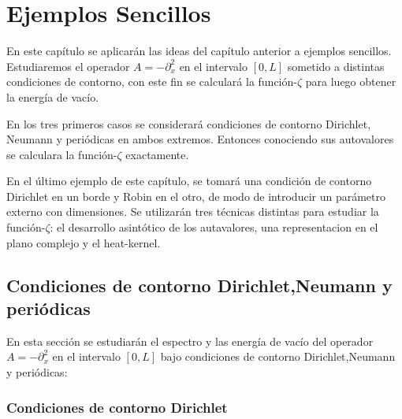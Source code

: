 \chapter{Ejemplos Sencillos}
\label{cap.sencillos}

En este capítulo se aplicarán las ideas del capítulo anterior a ejemplos sencillos. Estudiaremos el operador $A = - \partial ^2 _x$ en el intervalo $[0,L]$ sometido a distintas condiciones de contorno, con este fin se calculará la función-$\zeta$ para luego obtener la energía de vacío. 

En los tres primeros casos se considerará condiciones de contorno Dirichlet, Neumann y periódicas en ambos extremos. Entonces conociendo sus autovalores  se calculara la función-$\zeta$ exactamente. 

En el último ejemplo de este capítulo, se tomará una condición de contorno Dirichlet en un borde y Robin en el otro, de modo de introducir un parámetro externo con dimensiones. Se utilizarán tres técnicas distintas para estudiar la función-$\zeta$: el desarrollo asintótico de los autavalores, una representacion en el plano complejo  y el heat-kernel.

\section{Condiciones de contorno Dirichlet,Neumann y periódicas}
\label{sec.Dirichlet}

En esta sección se estudiarán el espectro y las energía de vacío del operador $A = - \partial ^2 _x$ en el intervalo $[0,L]$ bajo condiciones de contorno Dirichlet,Neumann y periódicas:\\

\subsection*{Condiciones de contorno Dirichlet}


